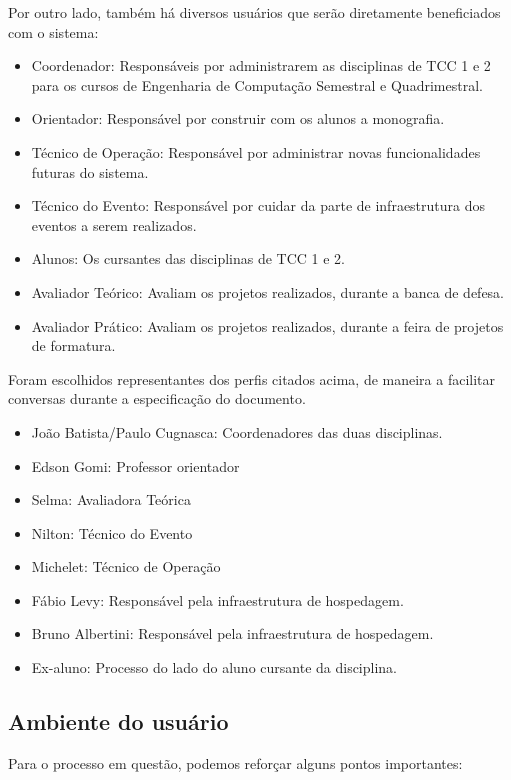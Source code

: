 Por outro lado, também há diversos usuários que serão diretamente beneficiados com o sistema:

\begin{itemize}
    \item Coordenador: Responsáveis por administrarem as disciplinas de TCC 1 e 2 para os cursos de Engenharia de Computação Semestral e Quadrimestral.
    \item Orientador: Responsável por construir com os alunos a monografia.
    \item Técnico de Operação: Responsável por administrar novas funcionalidades futuras do sistema.
    \item Técnico do Evento: Responsável por cuidar da parte de infraestrutura dos eventos a serem realizados.
    \item Alunos: Os cursantes das disciplinas de TCC 1 e 2.
    \item Avaliador Teórico: Avaliam os projetos realizados, durante a banca de defesa.
    \item Avaliador Prático: Avaliam os projetos realizados, durante a feira de projetos de formatura.
\end{itemize}

Foram escolhidos representantes dos perfis citados acima, de maneira a facilitar conversas durante a especificação do documento.

\begin{itemize}
    \item João Batista/Paulo Cugnasca: Coordenadores das duas disciplinas.
    \item Edson Gomi: Professor orientador
    \item Selma: Avaliadora Teórica
    \item Nilton: Técnico do Evento
    \item Michelet: Técnico de Operação
    \item Fábio Levy: Responsável pela infraestrutura de hospedagem.
    \item Bruno Albertini: Responsável pela infraestrutura de hospedagem.
    \item Ex-aluno: Processo do lado do aluno cursante da disciplina.
\end{itemize}

\subsection{Ambiente do usuário}
Para o processo em questão, podemos reforçar alguns pontos importantes:


